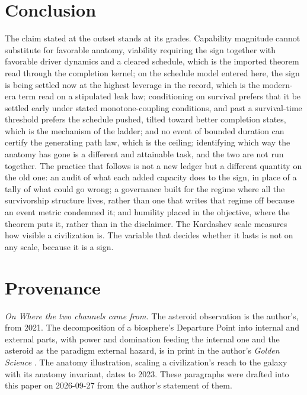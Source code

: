 \section{Conclusion}\label{sec:conclusion}

The claim stated at the outset stands at its grades. Capability
magnitude cannot substitute for favorable anatomy, viability requiring
the sign together with favorable driver dynamics and a cleared
schedule, which is the imported theorem read through the completion
kernel; on the schedule model entered here, the sign is being settled
now at the highest leverage in the record, which is the modern-era term
read on a stipulated leak law; conditioning on survival prefers that it
be settled early under stated monotone-coupling conditions, and past a
survival-time threshold prefers the schedule pushed, tilted toward
better completion states, which is the mechanism of the ladder; and no event of bounded duration can certify the generating path law, which is the ceiling; identifying which way the anatomy has gone is a different and attainable task, and the two are not run together. The
practice that follows is not a new ledger but a different quantity on
the old one: an audit of what each added capacity does to the sign, in
place of a tally of what could go wrong; a governance built for the
regime where all the survivorship structure lives, rather than one that
writes that regime off because an event metric condemned it; and
humility placed in the objective, where the theorem puts it, rather than
in the disclaimer. The Kardashev scale measures how visible a
civilization is. The variable that decides whether it lasts is not on
any scale, because it is a sign.


\section*{Provenance}

\noindent\textit{On Where the two channels came from.} The asteroid observation is the author's, from 2021. The decomposition of a biosphere's Departure Point into internal and external parts, with power and domination feeding the internal one and the asteroid as the paradigm external hazard, is in print in the author's \emph{Golden Science} \cite{GoldenScience2022}. The anatomy illustration, scaling a civilization's reach to the galaxy with its anatomy invariant, dates to 2023. These paragraphs were drafted into this paper on 2026-09-27 from the author's statement of them.

\printbibliography
